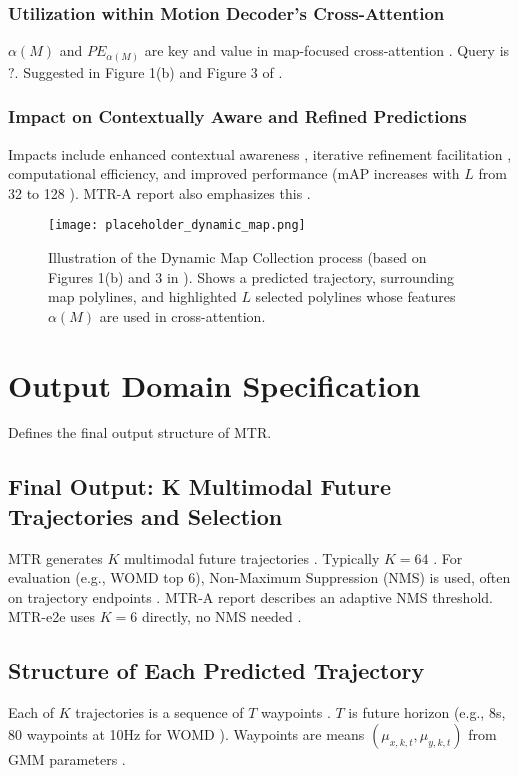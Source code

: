 \subsubsection{Utilization within Motion Decoder's Cross-Attention}
$\alpha(M)$ and $PE_{\alpha(M)}$ are key and value in map-focused cross-attention \cite{Shi2022MTR}. Query is $?$. Suggested in Figure 1(b) and Figure 3 of \cite{Shi2022MTR}.

\subsubsection{Impact on Contextually Aware and Refined Predictions}
Impacts include enhanced contextual awareness \cite{Shi2022MTR}, iterative refinement facilitation \cite{Shi2022MTR}, computational efficiency, and improved performance (mAP increases with $L$ from 32 to 128 \cite{Shi2022MTR}). MTR-A report also emphasizes this \cite{Shi2022MTR_A}.

\begin{figure}[h!]
    \centering
    \texttt{[image: placeholder\_dynamic\_map.png]} %
    \caption{Illustration of the Dynamic Map Collection process (based on Figures 1(b) and 3 in \cite{Shi2022MTR}). Shows a predicted trajectory, surrounding map polylines, and highlighted $L$ selected polylines whose features $\alpha(M)$ are used in cross-attention.}
    \label{fig:dynamic_map}
\end{figure}

\section{Output Domain Specification}
\label{sec:output_domain}

Defines the final output structure of MTR.

\subsection{Final Output: K Multimodal Future Trajectories and Selection}
MTR generates $K$ multimodal future trajectories \cite{Shi2022MTR, Shi2022MTR_A}. Typically $K=64$ \cite{Shi2022MTR, Shi2022MTR_A}. For evaluation (e.g., WOMD top 6), Non-Maximum Suppression (NMS) is used, often on trajectory endpoints \cite{Shi2022MTR}. MTR-A report \cite{Shi2022MTR_A} describes an adaptive NMS threshold. MTR-e2e uses $K=6$ directly, no NMS needed \cite{Shi2022MTR}.

\subsection{Structure of Each Predicted Trajectory}
Each of $K$ trajectories is a sequence of $T$ waypoints \cite{Vaswani2017Attention}. $T$ is future horizon (e.g., 8s, 80 waypoints at 10Hz for WOMD \cite{WOMD2021}). Waypoints are means $(\mu_{x,k,t}, \mu_{y,k,t})$ from GMM parameters \cite{Chai2019MultiPath}.

